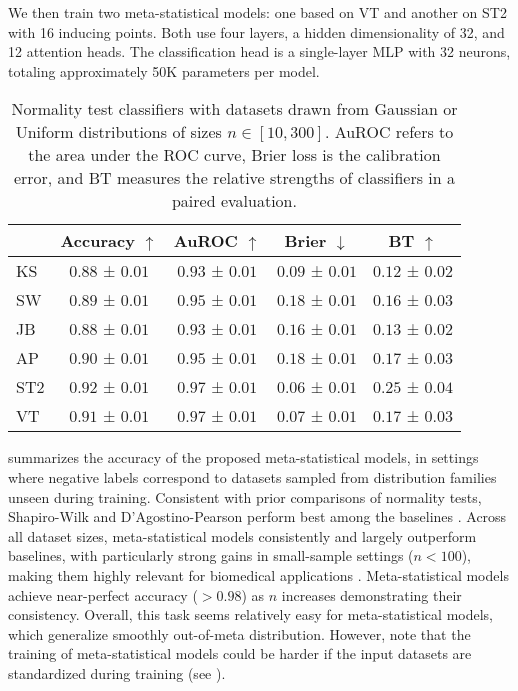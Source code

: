 We then train two meta-statistical models: one based on VT and another on ST2 with 16 inducing points. Both use four layers, a hidden dimensionality of 32, and 12 attention heads. The classification head is a single-layer MLP with 32 neurons, totaling approximately 50K parameters per model.

\begin{table}[h]
\centering
\begin{tabular}{l|cccc}
\toprule
 & Accuracy $\uparrow$ & AuROC $\uparrow$ & Brier $\downarrow$ & BT $\uparrow$ \\
\midrule
KS & $0.88$ {\scriptsize± $0.01$} & $0.93$ {\scriptsize± $0.01$} & $0.09$ {\scriptsize± $0.01$} & $0.12$ {\scriptsize± $0.02$} \\
SW & $0.89$ {\scriptsize± $0.01$} & $0.95$ {\scriptsize± $0.01$} & $0.18$ {\scriptsize± $0.01$} & $0.16$ {\scriptsize± $0.03$} \\
JB & $0.88$ {\scriptsize± $0.01$} & $0.93$ {\scriptsize± $0.01$} & $0.16$ {\scriptsize± $0.01$} & $0.13$ {\scriptsize± $0.02$} \\
AP & $0.90$ {\scriptsize± $0.01$} & $0.95$ {\scriptsize± $0.01$} & $0.18$ {\scriptsize± $0.01$} & $0.17$ {\scriptsize± $0.03$} \\
ST2 & $\mathbf{0.92}$ {\scriptsize± $0.01$} & $\mathbf{0.97}$ {\scriptsize± $0.01$} & $\mathbf{0.06}$ {\scriptsize± $0.01$} & $\mathbf{0.25}$ {\scriptsize± $0.04$} \\
VT & $0.91$ {\scriptsize± $0.01$} & $\mathbf{0.97}$ {\scriptsize± $0.01$} & $\mathbf{0.07}$ {\scriptsize± $0.01$} & $0.17$ {\scriptsize± $0.03$} \\
\bottomrule
\end{tabular}
\caption{Normality test classifiers with datasets drawn from Gaussian or Uniform distributions of sizes $n \in [10, 300]$. AuROC refers to the area under the ROC curve, Brier loss is the calibration error, and BT measures the relative strengths of classifiers in a paired evaluation.}
\label{tab:normality_test}
\end{table}


 summarizes the accuracy of the proposed meta-statistical models, in settings where negative labels correspond to datasets sampled from distribution families unseen during training. Consistent with prior comparisons of normality tests, Shapiro-Wilk and D'Agostino-Pearson perform best among the baselines \cite{razali2011power}. Across all dataset sizes, meta-statistical models consistently and largely outperform baselines, with particularly strong gains in small-sample settings (\( n < 100 \)), making them highly relevant for biomedical applications \cite{doi:10.4078/jrd.2019.26.1.5}. Meta-statistical models achieve near-perfect accuracy (\( > 0.98 \)) as \( n \) increases demonstrating their consistency. Overall, this task seems relatively easy for meta-statistical models, which generalize smoothly out-of-meta distribution. However, note that the training of meta-statistical models could be harder if the input datasets are standardized during training (see ). 

